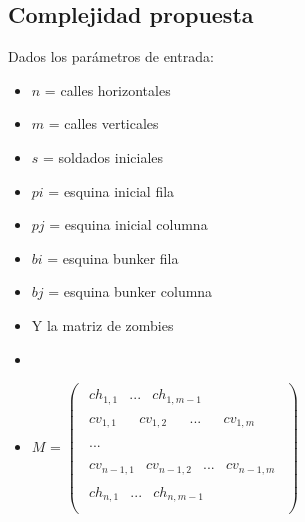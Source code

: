 \pagebreak

\subsection{Complejidad propuesta}

Dados los parámetros de entrada:

\medskip

\begin{centering}
\begin{multicols}{2}
  \begin{itemize}[noitemsep,nolistsep]
      \item $n$ = calles horizontales
      \item $m$ = calles verticales
      \item $s$ = soldados iniciales
      \item $pi$ = esquina inicial fila
      \item $pj$ = esquina inicial columna
      \item $bi$ = esquina bunker fila
      \item $bj$ = esquina bunker columna
    \end{itemize}
\columnbreak
  \begin{itemize}[noitemsep,nolistsep]
      \item[] Y la matriz de zombies
      \item[]
      \item $M$ =
        $
        \begin{pmatrix}
        \begin{matrix} ch_{1,1} & ... & ch_{1,m-1} \end{matrix}\\
        \begin{matrix} cv_{1,1} & & cv_{1,2} & & ... & & cv_{1,m} \end{matrix}\\
        \begin{matrix} ... \end{matrix}\\
        \begin{matrix} cv_{n-1,1} & cv_{n-1,2} & ... & cv_{n-1,m} \end{matrix}\\
        \begin{matrix} ch_{n,1} & ... & ch_{n,m-1} \end{matrix}\\
        \end{pmatrix}
        $
  \end{itemize}
\end{multicols}
\end{centering}

